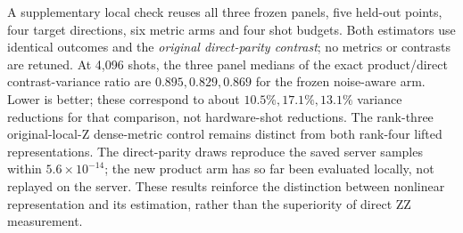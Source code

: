 A supplementary local check reuses all three frozen panels, five
held-out points, four target directions, six metric arms and four
shot budgets. Both estimators use identical outcomes and the
\emph{original direct-parity contrast}; no metrics or contrasts are
retuned. At 4,096 shots, the three panel medians of the exact
product/direct contrast-variance ratio are $0.895,0.829,0.869$ for
the frozen noise-aware arm. Lower is better; these correspond to
about $10.5\%,17.1\%,13.1\%$ variance reductions for that comparison,
not hardware-shot reductions. The rank-three original-local-Z
dense-metric control remains distinct from both rank-four lifted
representations. The direct-parity draws reproduce the saved server
samples within $5.6\times10^{-14}$; the new product arm has so far
been evaluated locally, not replayed on the server. These results
reinforce the distinction between nonlinear representation and its
estimation, rather than the superiority of direct ZZ measurement.

